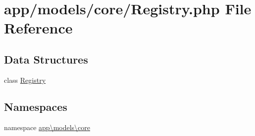 \hypertarget{_registry_8php}{\section{app/models/core/\-Registry.php File Reference}
\label{_registry_8php}
}
\subsection*{Data Structures}
\begin{DoxyCompactItemize}
\item 
class \hyperlink{classapp_1_1models_1_1core_1_1_registry}{Registry}
\end{DoxyCompactItemize}
\subsection*{Namespaces}
\begin{DoxyCompactItemize}
\item 
namespace \hyperlink{namespaceapp_1_1models_1_1core}{app\textbackslash{}models\textbackslash{}core}
\end{DoxyCompactItemize}
